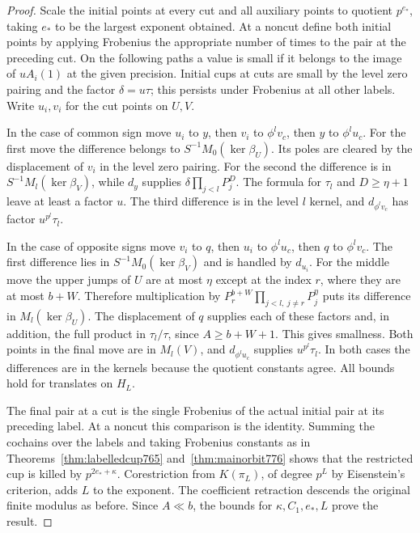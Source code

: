 \documentclass[a4paper,11pt]{article}
\theoremstyle{definition}
\theoremstyle{remark}
\numberwithin{equation}{section}
\begin{document}
\begin{proof}
Scale the initial points at every cut and all auxiliary
points to quotient \(p^{e_*}\), taking \(e_*\) to be the
largest exponent obtained. At a noncut define both
initial points by applying Frobenius the appropriate
number of times to the pair at the preceding cut. On
the following paths a value is small if it belongs to
the image of \(uA_i(1)\) at the given precision. Initial
cups at cuts are small by the level zero pairing and
the factor \(\delta=u\tau\); this persists under Frobenius
at all other labels. Write \(u_i,v_i\) for the cut points
on \(U,V\).

In the case of common sign move \(u_i\) to \(y\), then
\(v_i\) to \(\phi^l v_c\), then \(y\) to \(\phi^l u_c\).
For the first move the difference belongs to
\(S^{-1}M_0(\ker\beta_U)\). Its poles are cleared by
the displacement of \(v_i\) in the level zero pairing.
For the second the difference is in
\(S^{-1}M_l(\ker\beta_V)\), while \(d_y\) supplies
\(\delta\prod_{j<l}P_j^D\). The formula for \(\tau_l\)
and \(D\ge\eta+1\) leave at least a factor \(u\).
The third difference is in the level \(l\) kernel, and
\(d_{\phi^l v_c}\) has factor \(u^{p^l}\tau_l\).

In the case of opposite signs move \(v_i\) to \(q\),
then \(u_i\) to \(\phi^l u_c\), then \(q\) to \(\phi^l v_c\).
The first difference lies in \(S^{-1}M_0(\ker\beta_V)\)
and is handled by \(d_{u_i}\). For the middle move the
upper jumps of \(U\) are at most \(\eta\) except at the
index \(r\), where they are at most \(b+W\). Therefore
multiplication by \(P_r^{b+W}\prod_{j<l,\ j\ne r}P_j^\eta\)
puts its difference in \(M_l(\ker\beta_U)\). The
displacement of \(q\) supplies each of these factors and,
in addition, the full product in \(\tau_l/\tau\), since
\(A\ge b+W+1\). This gives smallness. Both points in the
final move are in \(M_l(V)\), and \(d_{\phi^l u_c}\)
supplies \(u^{p^l}\tau_l\). In both cases the differences
are in the kernels because the quotient constants agree.
All bounds hold for translates on \(H_L\).

The final pair at a cut is the single Frobenius of the
actual initial pair at its preceding label. At a noncut
this comparison is the identity. Summing the cochains
over the labels and taking Frobenius constants as in
Theorems~\ref{thm:labelledcup765} and~\ref{thm:mainorbit776}
shows that the restricted cup is killed by
\(p^{2e_*+\kappa}\). Corestriction from \(K(\pi_L)\),
of degree \(p^L\) by Eisenstein's criterion, adds \(L\)
to the exponent. The coefficient retraction descends
the original finite modulus as before. Since \(A\ll b\),
the bounds for \(\kappa,C_1,e_*,L\) prove the result.
\end{proof}
\clearpage
\end{document}
